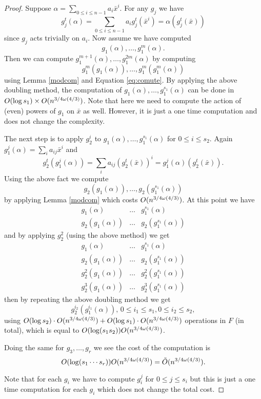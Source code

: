 \begin{proof}
Suppose $\alpha = \sum_{0\leq i \leq n-1} a_i \bar{x}^i$. For any $g_j$ we have 
\begin{equation}\label{eq:comute}
g_j^t(\alpha) = \sum_{0\leq i \leq n-1} a_i g_j^t(\bar{x}^i) = \alpha(g_j^t(\bar{x}))
\end{equation}
since $g_j$ acts trivially on $a_i$. Now assume we have computed 
 $$g_1(\alpha), \ldots , g_1^m(\alpha).$$ Then we can compute  $g_1^{m+1}(\alpha), \ldots , g_1^{2m}(\alpha)$ by computing $$g_1^m(g_1(\alpha)), \ldots , g_1^m(g_1^m(\alpha)) $$ using Lemma \ref{modcom} and Equation \ref{eq:comute}. By applying the above 
 doubling method, the computation of $g_1(\alpha), \ldots , g_1^{s_1}(\alpha)$ can be done in $ O(\log s_1) \times O(n^{3/4 \omega(4/3)})$.
 Note that here we need to compute the action of (even) powers of $g_1$ on $\bar{x}$ as well. However, it is just a one time
 computation and does not change the complexity. 

The next step is to apply $g_2^i$ to $g_1(\alpha), \ldots , g_1^{s_1}(\alpha)$ for $0\leq i \leq s_2$. Again 
$g_1^j(\alpha) = \sum_{i} a_{ij} \bar{x}^i$ and $$g_2^t(g_1^j(\alpha)) = \sum_{i} a_{ij} (g_2^t(\bar{x}))^i = g_1^j(\alpha)(g_2^t(\bar{x})).$$
Using the above fact we compute 
$$g_2(g_1(\alpha)), \ldots , g_2(g_1^{s_1}(\alpha))$$
by applying Lemma \ref{modcom} which costs $O(n^{3/4 \omega(4/3)})$. At this point we have 
$$\begin{array}{lll} g_1(\alpha)& \ldots & g_1^{s_1}(\alpha)\\ g_2(g_1(\alpha))& \ldots & g_2(g_1^{s_1}(\alpha))\end{array}$$
and by applying $g_2^2$ (using the above method) we get 
$$\begin{array}{lll} g_1(\alpha)& \ldots & g_1^{s_1}(\alpha)\\ g_2(g_1(\alpha))& \ldots & g_2(g_1^{s_1}(\alpha))\\
g_2^2(g_1(\alpha))& \ldots & g_2^2(g_1^{s_1}(\alpha))\\g_2^3(g_1(\alpha))& \ldots & g_2^3(g_1^{s_1}(\alpha))
\end{array}$$
then by repeating the above doubling method we get
$$g_2^{i_2}(g_1^{i_1}(\alpha)), \, 0\leq i_1\leq s_1, 0 \leq i_2 \leq s_2,$$
using $O(\log s_2)\cdot O(n^{3/4 \omega(4/3)}) + O(\log s_1)\cdot O(n^{3/4 \omega(4/3)})$ operations in $F$ (in total), which is equal to $O(\log (s_1s_2))O(n^{3/4 \omega(4/3)})$. 

Doing the same for $g_3 , \ldots , g_r$ we see the cost of the computation is 
$$O(\log (s_1\cdots s_r))O(n^{3/4 \omega(4/3)}) = \tilde{O}(n^{3/4 \omega(4/3)}).$$

Note that for each $g_i$ we have to compute $g_i^j$ for $0 \leq j \leq s_i$ but this is just a one time computation for each $g_i$
which does not change the total cost.
\end{proof}

